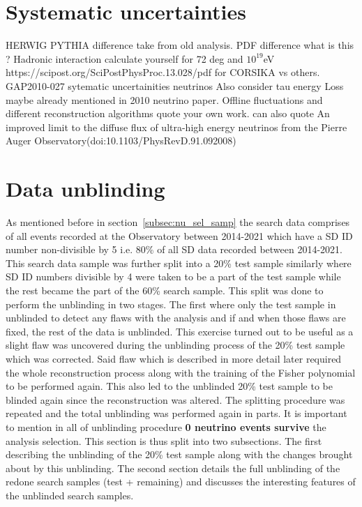 \section{Systematic uncertainties}
\label{sec:det_uncert}
HERWIG PYTHIA difference take from old analysis.
PDF difference what is this ?
Hadronic interaction calculate yourself for 72 deg and $10^{19}$eV
https://scipost.org/SciPostPhysProc.13.028/pdf for CORSIKA vs others.
GAP2010-027 sytematic uncertainities neutrinos 
Also consider tau energy Loss maybe already mentioned in 2010 neutrino paper. 
Offline fluctuations and different reconstruction algorithms quote your own work.
can also quote An improved limit to the diffuse flux of ultra-high energy neutrinos
from the Pierre Auger Observatory(doi:10.1103/PhysRevD.91.092008) 
\section{Data unblinding}
\label{sec:data_unblinding}
As mentioned before in section~\ref{subsec:nu_sel_samp} the search data comprises of all events recorded at the Observatory between 2014-2021 which have a SD ID number non-divisible by 5 i.e. 80\% of all SD data recorded between 2014-2021. This search data sample was further split into a 20\% test sample similarly where SD ID numbers divisible by 4 were taken to be a part of the test sample while the rest became the part of the 60\% search sample. This split was done to perform the unblinding in two stages. The first where only the test sample in unblinded to detect any flaws with the analysis and if and when those flaws are fixed, the rest of the data is unblinded. This exercise turned out to be useful as a slight flaw was uncovered during the unblinding process of the 20\% test sample which was corrected. Said flaw which is described in more detail later required the whole reconstruction process along with the training of the Fisher polynomial to be performed again. This also led to the unblinded 20\% test sample to be blinded again since the reconstruction was altered. The splitting procedure was repeated and the total unblinding was performed again in parts. It is important to mention in all of unblinding procedure \textbf{0 neutrino events survive} the analysis selection.
This section is thus split into two subsections. The first describing the unblinding of the 20\% test sample along with the changes brought about by this unblinding. The second section details the full unblinding of the redone search samples (test + remaining) and discusses the interesting features of the unblinded search samples. 

